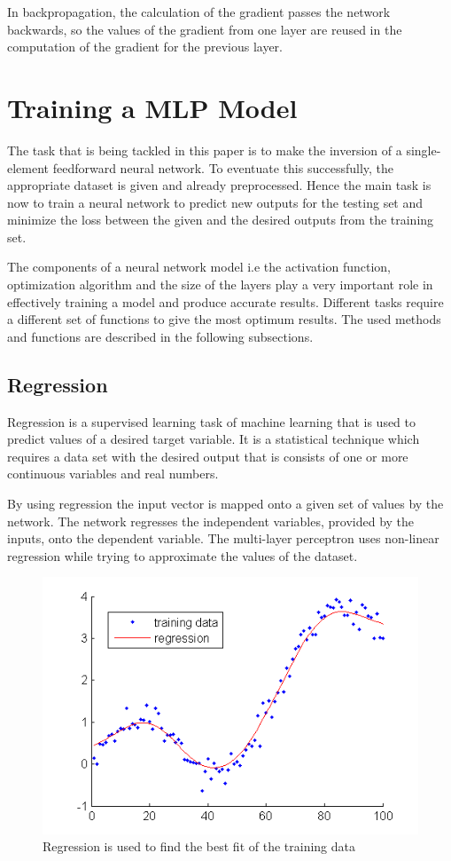 In backpropagation, the calculation of the gradient passes the network backwards, so the values of the gradient from one layer are reused in the computation of the gradient for the previous layer. 



\section{Training a MLP Model}

The task that is being tackled in this paper is to make the inversion of a single-element feedforward neural network. To eventuate this successfully, the appropriate dataset is given and already preprocessed. Hence the main task is now to train a neural network to predict new outputs for the testing set and minimize the loss between the given and the desired outputs from the training set. \medskip

The components of a neural network model i.e the activation function, optimization algorithm and the size of the layers play a very important role in effectively training a model and produce accurate results. Different tasks require a different set of functions to give the most optimum results. The used methods and functions are described in the following subsections.


\subsection{Regression}

Regression \cite{allen2007understanding} is a supervised learning task of machine learning that is used to predict values of a desired target variable. It is a statistical technique which requires a data set with the desired output that is consists of one or more continuous variables and real numbers.\smallskip

By using regression the input vector is mapped onto a given set of values by the network. The network regresses the independent variables, provided by the inputs, onto the dependent variable. The multi-layer perceptron uses non-linear regression while trying to approximate the values of the dataset.

\begin{figure}[h]
	\centering
	\includegraphics[height=0.4\linewidth]{./figures/regression}
	\caption{Regression is used to find the best fit of the training
		data}
	\label{fig:regression}
\end{figure}


